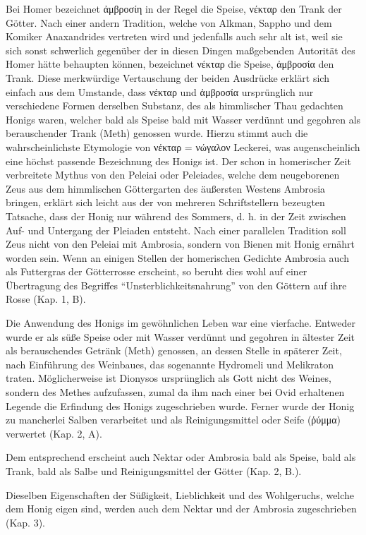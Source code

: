 \documentclass[a4paper, 11pt, oneside]{article}
\begin{document}
Bei Homer bezeichnet ἀμβροσίη in der Regel die Speise, νέκταρ den Trank der Götter. Nach einer andern Tradition, welche von Alkman, Sappho und dem Komiker Anaxandrides vertreten wird und jedenfalls auch sehr alt ist, weil sie sich sonst schwerlich gegenüber der in diesen Dingen maßgebenden Autorität des Homer hätte behaupten können, bezeichnet νέκταρ die Speise, ἀμβροσία den Trank. Diese merkwürdige Vertauschung der beiden Ausdrücke erklärt sich einfach aus dem Umstande, dass νέκταρ und ἀμβροσία ursprünglich nur verschiedene Formen derselben Substanz, des als himmlischer Thau gedachten Honigs waren, welcher bald als Speise bald mit Wasser verdünnt und gegohren als berauschender Trank (Meth) genossen wurde. Hierzu stimmt auch die wahrscheinlichste Etymologie von νέκταρ = νώγαλον Leckerei, was augenscheinlich eine höchst passende Bezeichnung des Honigs ist. Der schon in homerischer Zeit verbreitete Mythus von den Peleiai oder Peleiades, welche dem neugeborenen Zeus aus dem himmlischen Göttergarten des äußersten Westens Ambrosia bringen, erklärt sich leicht aus der von mehreren Schriftstellern bezeugten Tatsache, dass der Honig nur während des Sommers, d. h. in der Zeit zwischen Auf- und Untergang der Pleiaden entsteht. Nach einer parallelen Tradition soll Zeus nicht von den Peleiai mit Ambrosia, sondern von Bienen mit Honig ernährt worden sein. Wenn an einigen Stellen der homerischen Gedichte Ambrosia auch als Futtergras der Götterrosse erscheint, so beruht dies wohl auf einer Übertragung des Begriffes "`Unsterblichkeitsnahrung"' von den Göttern auf ihre Rosse (Kap. 1, B).

Die Anwendung des Honigs im gewöhnlichen Leben war eine vierfache. Entweder wurde er als süße Speise oder mit Wasser verdünnt und gegohren in ältester Zeit als berauschendes Getränk (Meth) genossen, an dessen Stelle in späterer Zeit, nach Einführung des Weinbaues, das sogenannte Hydromeli und Melikraton traten. Möglicherweise ist Dionysos ursprünglich als Gott nicht des Weines, sondern des Methes aufzufassen, zumal da ihm nach einer bei Ovid erhaltenen Legende die Erfindung des Honigs zugeschrieben wurde. Ferner wurde der Honig zu mancherlei Salben verarbeitet und als Reinigungsmittel oder Seife (ῥύμμα) verwertet (Kap. 2, A).

Dem entsprechend erscheint auch Nektar oder Ambrosia bald als Speise, bald als Trank, bald als Salbe und Reinigungsmittel der Götter (Kap. 2, B.).

Dieselben Eigenschaften der Süßigkeit, Lieblichkeit und des Wohlgeruchs, welche dem Honig eigen sind, werden auch dem Nektar und der Ambrosia zugeschrieben (Kap. 3).
\end{document}
